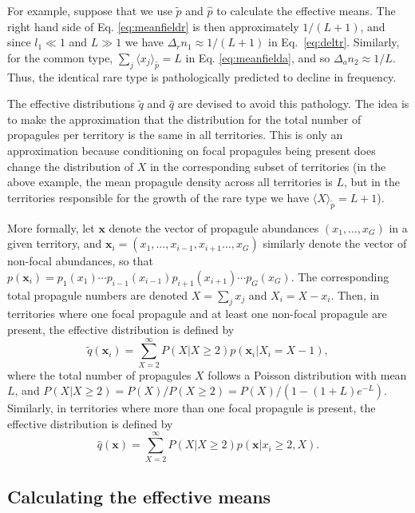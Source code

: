 \documentclass[12pt]{article}
\begin{document}
For example, suppose that we use $\tilde{p}$ and $\hat{p}$ to calculate the effective means. The right hand side of Eq. \eqref{eq:meanfieldr} is then approximately $1/(L+1)$, and since $l_1\ll 1$ and $L\gg 1$ we have $\Delta_r n_1 \approx 1/(L+1)$ in Eq.~\eqref{eq:deltr}. Similarly, for the common type, $\sum_j \langle x_j\rangle_{\hat{p}} = L$ in Eq. \eqref{eq:meanfielda}, and so $\Delta_a n_2 \approx 1/L$. Thus, the identical rare type is  pathologically predicted to decline in frequency.

The effective distributions $\tilde{q}$ and $\hat{q}$ are devised to avoid this pathology. The idea is to make the approximation that the distribution for the total number of propagules per territory is the same in all territories. This is only an approximation because conditioning on focal propagules being present does change the distribution of $X$ in the corresponding subset of territories (in the above example, the mean propagule density across all territories is $L$, but in the territories responsible for the growth of the rare type we have $\langle X \rangle_{\tilde{p}}=L+1$). 

More formally, let ${\mathbf x}$ denote the vector of propagule abundances $(x_1,\ldots,x_G)$ in a given territory, and ${\mathbf x_i}=(x_1,\ldots,x_{i-1},x_{i+1}\ldots,x_G)$ similarly denote the vector of non-focal abundances, so that $p({\mathbf x_i})=p_1(x_1)\cdots p_{i-1}(x_{i-1})p_{i+1}(x_{i+1})\cdots p_G(x_G)$. The corresponding total propagule numbers are denoted $X=\sum_j x_j$ and $X_i=X-x_i$. Then, in territories where one focal propagule and at least one non-focal propagule are present, the effective distribution is defined by 
\begin{equation}
\tilde{q}({\mathbf x_i})=\sum_{X=2}^{\infty}P(X|X\geq 2) p({\mathbf x_i}|X_i=X-1),
\end{equation}
where the total number of propagules $X$ follows a Poisson distribution with mean $L$, and $P(X|X\geq 2)=P(X)/P(X\geq 2)=P(X)/(1-(1+L)e^{-L})$. Similarly, in territories where more than one focal propagule is present, the effective distribution is defined by 
\begin{equation}
\hat{q}({\mathbf x})=\sum_{X=2}^{\infty}P(X|X\geq 2) p({\mathbf x}|x_i\geq 2, X).
\end{equation}
 
\subsection*{Calculating the effective means}
\end{document}
